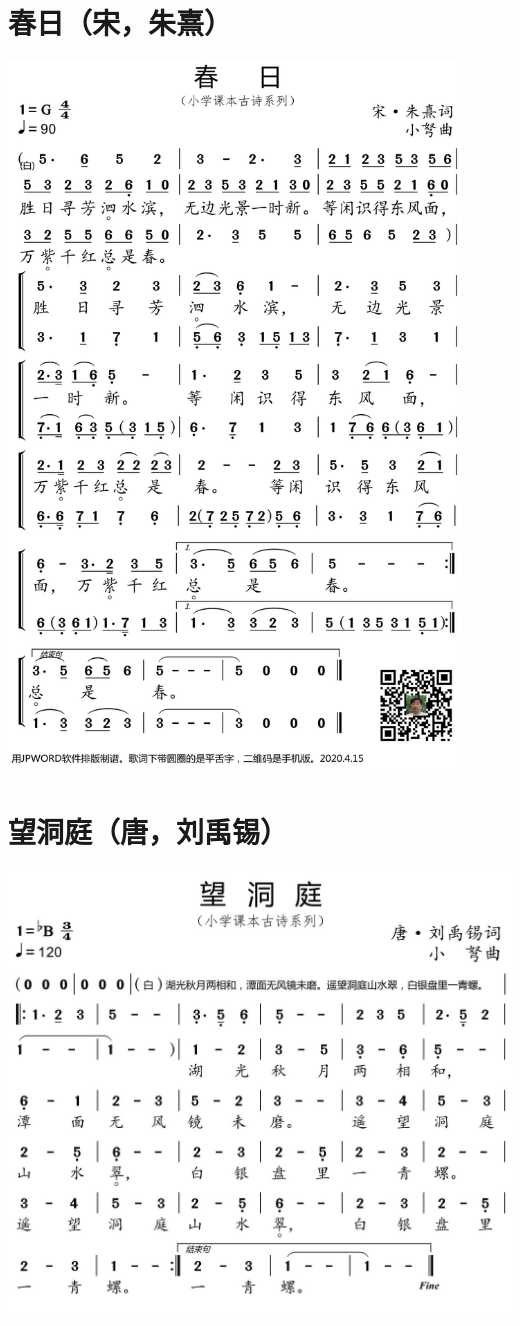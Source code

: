 \documentclass[cn,pad,chinesefont=nofont,twocol]{elegantbook}
\begin{document}
\section{春日（宋，朱熹）}
    \includegraphics[width=0.9\textwidth]{dongxiao/20200627-古诗-春日.jpg}   
\section{望洞庭（唐，刘禹锡）}
    \includegraphics[width=\textwidth]{dongxiao/20200627-古诗-望洞庭.jpg}   
\end{document}
